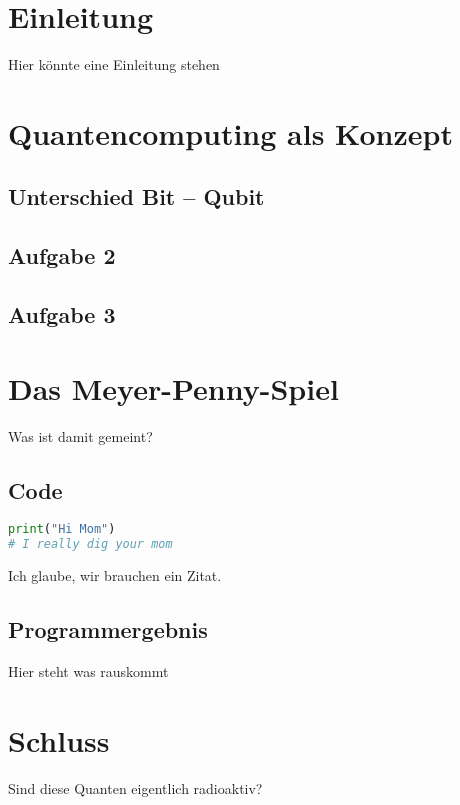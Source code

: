 \chapter{Einleitung}
Hier könnte eine Einleitung stehen

\chapter{Quantencomputing als Konzept}
\section{Unterschied Bit -- Qubit}

\section{Aufgabe 2}
\section{Aufgabe 3}


\chapter{Das Meyer-Penny-Spiel}
Was ist damit gemeint?

\section{Code}
\begin{lstlisting}[caption=Python-Code \texttt{./mybestpython.py}, label=pythoncodebeispiel, language=python]
print("Hi Mom") 
# I really dig your mom
\end{lstlisting}
Ich glaube, wir brauchen ein Zitat\cite{NielsenChuang}.

\section{Programmergebnis}
Hier steht was rauskommt

\chapter{Schluss}
Sind diese Quanten eigentlich radioaktiv?